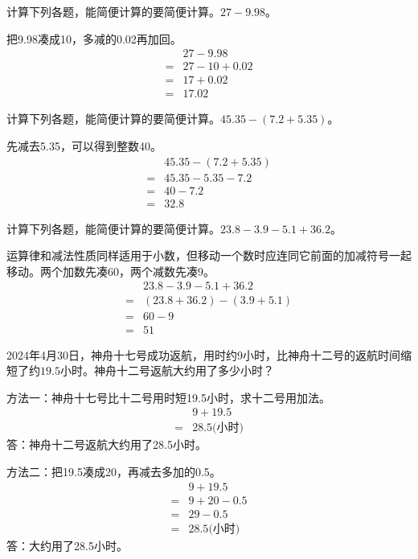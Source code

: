 计算下列各题，能简便计算的要简便计算。\(27-9.98\)。\par
\begin{BookAnswer}
把9.98凑成10，多减的0.02再加回。\[\begin{aligned}&27-9.98\\={}&27-10+0.02\\={}&17+0.02\\={}&17.02\end{aligned}\]
\end{BookAnswer}

计算下列各题，能简便计算的要简便计算。\(45.35-(7.2+5.35)\)。\par
\begin{BookAnswer}
先减去5.35，可以得到整数40。\[\begin{aligned}&45.35-(7.2+5.35)\\={}&45.35-5.35-7.2\\={}&40-7.2\\={}&32.8\end{aligned}\]
\end{BookAnswer}

计算下列各题，能简便计算的要简便计算。\(23.8-3.9-5.1+36.2\)。\par
\begin{BookAnswer}
运算律和减法性质同样适用于小数，但移动一个数时应连同它前面的加减符号一起移动。两个加数先凑60，两个减数先凑9。\[\begin{aligned}&23.8-3.9-5.1+36.2\\={}&(23.8+36.2)-(3.9+5.1)\\={}&60-9\\={}&51\end{aligned}\]
\end{BookAnswer}

2024年4月30日，神舟十七号成功返航，用时约9小时，比神舟十二号的返航时间缩短了约\(19.5\)小时。神舟十二号返航大约用了多少小时？\par
\begin{BookAnswer}
方法一：神舟十七号比十二号用时短19.5小时，求十二号用加法。\[\begin{aligned}&9+19.5\\={}&28.5\text{(小时)}\end{aligned}\]答：神舟十二号返航大约用了28.5小时。\par 方法二：把19.5凑成20，再减去多加的0.5。\[\begin{aligned}&9+19.5\\={}&9+20-0.5\\={}&29-0.5\\={}&28.5\text{(小时)}\end{aligned}\]答：大约用了28.5小时。
\end{BookAnswer}

